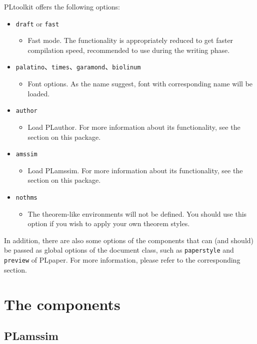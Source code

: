 \documentclass[allowbf]{lebhart}
\providecommand{\PLtoolkit}{\textsf{PLtoolkit}}
\providecommand{\PLamssim}{\textsf{PLamssim}}
\providecommand{\PLauthor}{\textsf{PLauthor}}
\providecommand{\PLpaper}{\textsf{PLpaper}}
\begin{document}
\PLtoolkit{} offers the following options:
\begin{itemize}
    \item \texttt{draft} or \texttt{fast}
        \begin{itemize}
            \item Fast mode. The functionality is appropriately reduced to get faster compilation speed, recommended to use during the writing phase.
        \end{itemize}
    \item \texttt{palatino}、\texttt{times}、\texttt{garamond}、\texttt{biolinum}
        \begin{itemize}
            \item Font options. As the name suggest, font with corresponding name will be loaded.
        \end{itemize}
    \item \texttt{author}
        \begin{itemize}
            \item Load \PLauthor{}. For more information about its functionality, see the section on this package.
        \end{itemize}
    \item \texttt{amssim}
        \begin{itemize}
            \item Load \PLamssim{}. For more information about its functionality, see the section on this package.
        \end{itemize}
    \item \texttt{nothms}
        \begin{itemize}
            \item The theorem-like environments will not be defined. You should use this option if you wish to apply your own theorem styles.
        \end{itemize}
\end{itemize}
In addition, there are also some options of the components that can (and should) be passed as global options of the document class, such as \texttt{paperstyle} and \texttt{preview} of \PLpaper{}. For more information, please refer to the corresponding section.

\section{The components}

\subsection{PLamssim}
\end{document}
